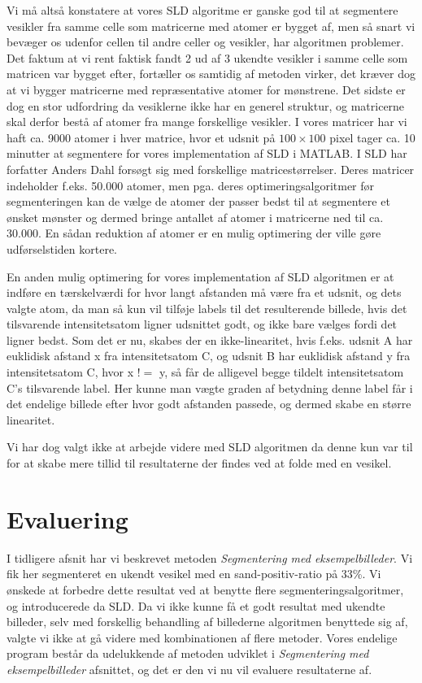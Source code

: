 Vi må altså konstatere at vores SLD algoritme er ganske god til at segmentere vesikler fra samme celle som matricerne med atomer er bygget af, men så snart vi bevæger os udenfor cellen til andre celler og vesikler, har algoritmen problemer. Det faktum at vi rent faktisk fandt 2 ud af 3 ukendte vesikler i samme celle som matricen var bygget efter, fortæller os samtidig af metoden virker, det kræver dog at vi bygger matricerne med repræsentative atomer for mønstrene. Det sidste er dog en stor udfordring da vesiklerne ikke har en generel struktur, og matricerne skal derfor bestå af atomer fra mange forskellige vesikler. I vores matricer har vi haft ca. 9000 atomer i hver matrice, hvor et udsnit på $100\times100$ pixel tager ca. 10 minutter at segmentere for vores implementation af SLD i MATLAB. I SLD\cite{sld} har forfatter Anders Dahl forsøgt sig med forskellige matricestørrelser. Deres matricer indeholder f.eks. 50.000 atomer, men pga. deres optimeringsalgoritmer før segmenteringen kan de vælge de atomer der passer bedst til at segmentere et ønsket mønster og dermed bringe antallet af atomer i matricerne ned til ca. 30.000. En sådan reduktion af atomer er en mulig optimering der ville gøre udførselstiden kortere. 

En anden mulig optimering for vores implementation af SLD algoritmen er at indføre en tærskelværdi for hvor langt afstanden må være fra et udsnit, og dets valgte atom, da man så kun vil tilføje labels til det resulterende billede, hvis det tilsvarende intensitetsatom ligner udsnittet godt, og ikke bare vælges fordi det ligner bedst. Som det er nu, skabes der en ikke-linearitet, hvis f.eks. udsnit A har euklidisk afstand x fra intensitetsatom C, og udsnit B har euklidisk afstand y fra intensitetsatom C, hvor x $!=$ y, så får de alligevel begge tildelt intensitetsatom C's tilsvarende label. Her kunne man vægte graden af betydning denne label får i det endelige billede efter hvor godt afstanden passede, og dermed skabe en større linearitet. 

Vi har dog valgt ikke at arbejde videre med SLD algoritmen da denne kun var til for at skabe mere tillid til resultaterne der findes ved at folde med en vesikel. \\

\newpage
\section{Evaluering}
I tidligere afsnit har vi beskrevet metoden \emph{Segmentering med eksempelbilleder}. Vi fik her segmenteret en ukendt vesikel med en sand-positiv-ratio på 33\%. Vi ønskede at forbedre dette resultat ved at benytte flere segmenteringsalgoritmer, og introducerede da SLD. Da vi ikke kunne få et godt resultat med ukendte billeder, selv med forskellig behandling af billederne algoritmen benyttede sig af, valgte vi ikke at gå videre med kombinationen af flere metoder. Vores endelige program består da udelukkende af metoden udviklet i \emph{Segmentering med eksempelbilleder} afsnittet, og det er den vi nu vil evaluere resultaterne af.

